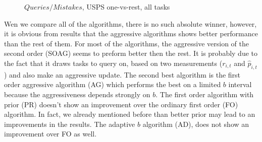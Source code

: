\begin{figure}[h]
\begin{centering}
\caption{${Queries}/{Mistakes}$, USPS one-vs-rest, all tasks}
\label{fig:qr_er_frac}
\end{centering}
\end{figure}


Wen we compare all of the algorithms, there is no such absolute winner, however, 
it is obvious from results that the aggressive algorithms shows better 
performance than the rest of them. For most of the algorithms, the aggressive version of the second order (SOAG) seems to preform better 
then the rest. It is probably due to the fact that it draws tasks to query on, based on two measurements 
($r_{i,t} $ and $\hat{p}_{i,t}$) and also make an aggressive update. The second best algorithm is  
the first order aggressive algorithm (AG) which performs the best on a 
limited $b$ interval because the aggressiveness depends strongly on $b$. The 
first order algorithm with prior (PR) doesn't show an improvement over the ordinary first order (FO) algorithm. 
In fact, we already mentioned before than better prior may lead to an improvements in the results. 
The adaptive $b$ algorithm (AD), does not show an improvement over FO as well. 

